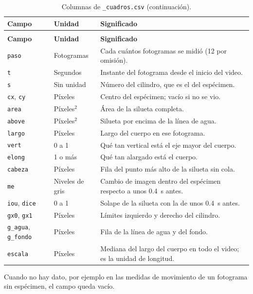 \begin{longtable}{|p{2.8cm}|p{2.2cm}|p{8.8cm}|}
\caption{Columnas de \texttt{\_cuadros.csv}.}
\label{tab:ap_cuadros}\\
\hline
\textbf{Campo} & \textbf{Unidad} & \textbf{Significado} \\
\hline
\endfirsthead
\caption[]{Columnas de \texttt{\_cuadros.csv} (continuación).}\\
\hline
\textbf{Campo} & \textbf{Unidad} & \textbf{Significado} \\
\hline
\endhead
\texttt{paso} & Fotogramas & Cada cuántos fotogramas se midió (12 por omisión). \\
\hline
\texttt{t} & Segundos & Instante del fotograma desde el inicio del video. \\
\hline
\texttt{s} & Sin unidad & Número del cilindro, que es el del espécimen. \\
\hline
\texttt{cx}, \texttt{cy} & Píxeles & Centro del espécimen; vacío si no se vio. \\
\hline
\texttt{area} & Píxeles$^2$ & Área de la silueta completa. \\
\hline
\texttt{above} & Píxeles$^2$ & Silueta por encima de la línea de agua. \\
\hline
\texttt{largo} & Píxeles & Largo del cuerpo en ese fotograma. \\
\hline
\texttt{vert} & 0 a 1 & Qué tan vertical está el eje mayor del cuerpo. \\
\hline
\texttt{elong} & 1 o más & Qué tan alargado está el cuerpo. \\
\hline
\texttt{cabeza} & Píxeles & Fila del punto más alto de la silueta sin cola. \\
\hline
\texttt{me} & Niveles de gris & Cambio de imagen dentro del espécimen respecto a
unos 0.4~s antes. \\
\hline
\texttt{iou}, \texttt{dice} & 0 a 1 & Solape de la silueta con la de unos 0.4~s
antes. \\
\hline
\texttt{gx0}, \texttt{gx1} & Píxeles & Límites izquierdo y derecho del cilindro. \\
\hline
\texttt{g\_agua}, \texttt{g\_fondo} & Píxeles & Fila de la línea de agua y del
fondo. \\
\hline
\texttt{escala} & Píxeles & Mediana del largo del cuerpo en todo el video; es la
unidad de longitud. \\
\hline
\end{longtable}

Cuando no hay dato, por ejemplo en las medidas de movimiento de un fotograma sin
espécimen, el campo queda vacío.

